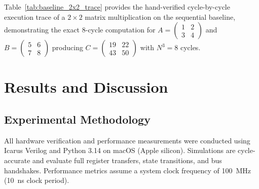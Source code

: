 \documentclass[conference]{IEEEtran}
\begin{document}
Table~\ref{tab:baseline_2x2_trace} provides the hand-verified cycle-by-cycle execution trace of a $2 \times 2$ matrix multiplication on the sequential baseline, demonstrating the exact 8-cycle computation for $A = \begin{pmatrix} 1 & 2 \\ 3 & 4 \end{pmatrix}$ and $B = \begin{pmatrix} 5 & 6 \\ 7 & 8 \end{pmatrix}$ producing $C = \begin{pmatrix} 19 & 22 \\ 43 & 50 \end{pmatrix}$ with $N^3 = 8$ cycles.

\begin{table}[htbp]
\caption{Cycle-by-Cycle Execution Trace for $2 \times 2$ Matrix Multiplication on Sequential Baseline}
\label{tab:baseline_2x2_trace}
\centering
{}
\end{table}

\section{Results and Discussion}

\subsection{Experimental Methodology}
All hardware verification and performance measurements were conducted using Icarus Verilog and Python 3.14 on macOS (Apple silicon). Simulations are cycle-accurate and evaluate full register transfers, state transitions, and bus handshakes. Performance metrics assume a system clock frequency of 100~MHz (10~ns clock period).
\end{document}
